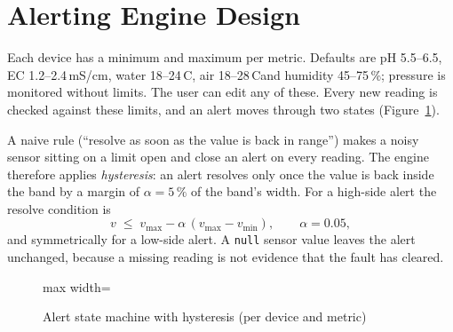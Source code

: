 \documentclass[11pt,a4paper,oneside]{report}
\newcommand{\degC}{\,\textdegree C}
\newcommand{\code}[1]{\texttt{#1}}
\begin{document}
\section{Alerting Engine Design}
Each device has a minimum and maximum per metric. Defaults are pH 5.5--6.5, EC
1.2--2.4\,mS/cm, water 18--24\degC, air 18--28\degC and humidity 45--75\,\%;
pressure is monitored without limits. The user can edit any of these. Every new
reading is checked against these limits, and an alert moves through two states
(Figure~\ref{fig:alertfsm}).

A naive rule (``resolve as soon as the value is back in range'') makes a noisy sensor
sitting on a limit open and close an alert on every reading. The engine therefore applies
\emph{hysteresis}: an alert resolves only once the value is back inside the band by a
margin of $\alpha = 5\,\%$ of the band's width. For a high-side alert the resolve
condition is
\begin{equation}
  v \;\le\; v_{\max} - \alpha\,(v_{\max} - v_{\min}), \qquad \alpha = 0.05,
  \label{eq:hyst}
\end{equation}
and symmetrically for a low-side alert. A \code{null} sensor value leaves the alert
unchanged, because a missing reading is not evidence that the fault has cleared.

\begin{figure}[htbp]
\centering
\begin{adjustbox}{max width=\linewidth}
\end{adjustbox}
\caption{Alert state machine with hysteresis (per device and metric)}
\label{fig:alertfsm}
\end{figure}
\end{document}
